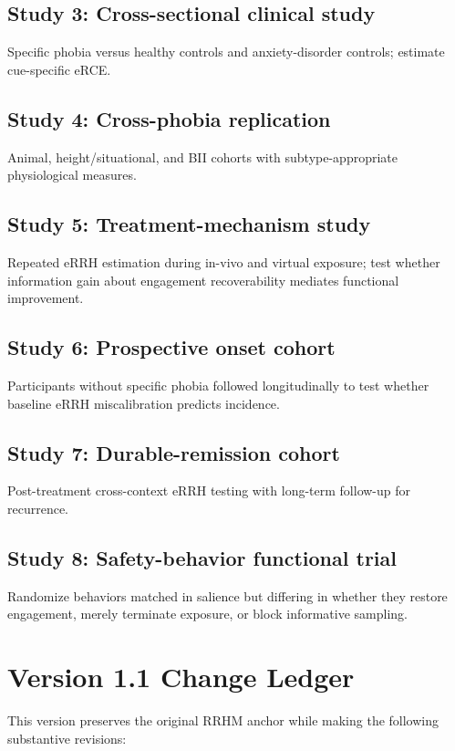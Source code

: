 \documentclass[11pt]{article}
\begin{document}
\subsection*{Study 3: Cross-sectional clinical study}
Specific phobia versus healthy controls and anxiety-disorder controls; estimate cue-specific eRCE.

\subsection*{Study 4: Cross-phobia replication}
Animal, height/situational, and BII cohorts with subtype-appropriate physiological measures.

\subsection*{Study 5: Treatment-mechanism study}
Repeated eRRH estimation during in-vivo and virtual exposure; test whether information gain about engagement recoverability mediates functional improvement.

\subsection*{Study 6: Prospective onset cohort}
Participants without specific phobia followed longitudinally to test whether baseline eRRH miscalibration predicts incidence.

\subsection*{Study 7: Durable-remission cohort}
Post-treatment cross-context eRRH testing with long-term follow-up for recurrence.

\subsection*{Study 8: Safety-behavior functional trial}
Randomize behaviors matched in salience but differing in whether they restore engagement, merely terminate exposure, or block informative sampling.

\section{Version 1.1 Change Ledger}

This version preserves the original RRHM anchor while making the following substantive revisions:
\end{document}
